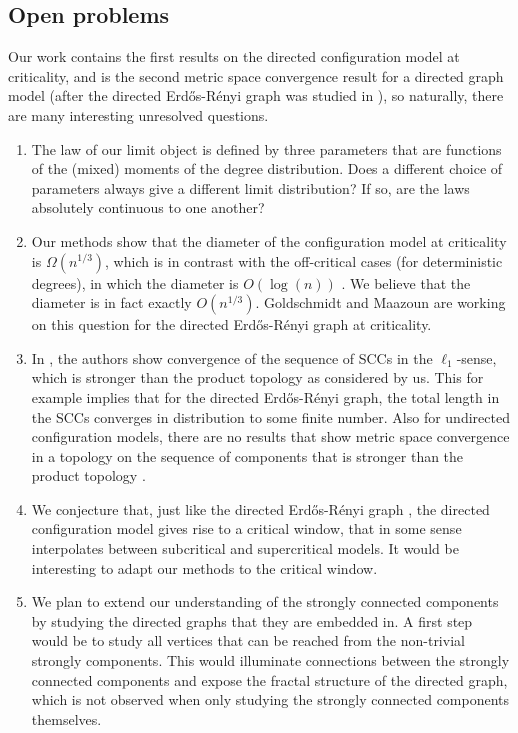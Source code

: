 \subsection{Open problems}
Our work contains the first results on the directed configuration model at criticality, and is the second metric space convergence result for a directed graph model (after the directed Erd\H{o}s-Rényi graph was studied in \cite{goldschmidtScalingLimitCritical2019}), so naturally, there are many interesting unresolved questions.
\begin{enumerate}
    \item The law of our limit object is defined by three parameters that are functions of the (mixed) moments of the degree distribution. Does a different choice of parameters always give a different limit distribution? If so, are the laws absolutely continuous to one another?
    \item Our methods show that the diameter of the configuration model at criticality is  $\Omega(n^{1/3})$, which is in contrast with the off-critical cases (for deterministic degrees), in which the diameter is $O(\log(n))$ \cite{caiDiameterDirectedConfiguration2020}. We believe that the diameter is in fact exactly $O(n^{1/3})$. Goldschmidt and Maazoun are working on this question for the directed Erd\H{o}s-Rényi graph at criticality. 
    \item In \cite{goldschmidtScalingLimitCritical2019}, the authors show convergence of the sequence of SCCs in the $\ell_1$-sense, which is stronger than the product topology as considered by us. This for example implies that for the directed Erd\H{o}s-Rényi graph, the total length in the SCCs converges in distribution to some finite number. Also for undirected configuration models, there are no results that show metric space convergence in a topology on the sequence of components that is stronger than the product topology \cite{Bhamidi2020}\cite{conchon--kerjanStableGraphMetric2020}\cite{Bhamidi2020Glmb}.
     \item We conjecture that, just like the directed Erd\H{o}s-Rényi graph \cite{goldschmidtScalingLimitCritical2019}, the directed configuration model gives rise to a critical window, that in some sense interpolates between subcritical and supercritical models. It would be interesting to adapt our methods to the critical window.
     \item We plan to extend our understanding of the strongly connected components by studying the directed graphs that they are embedded in. A first step would be to study all vertices that can be reached from the non-trivial strongly components. This would illuminate connections between the strongly connected components and expose the fractal structure of the directed graph, which is not observed when only studying the strongly connected components themselves.

\end{enumerate}
